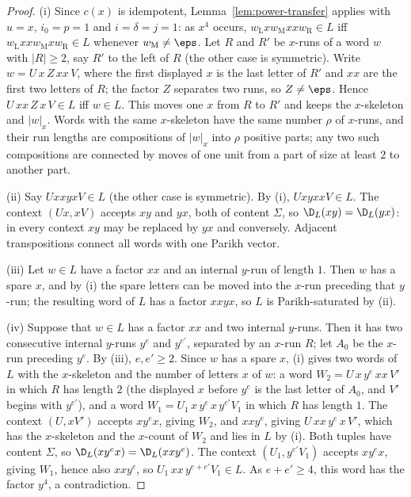 \begin{proof}
(i) Since $c(x)$ is idempotent, Lemma~\ref{lem:power-transfer} applies with
$u=x$, $i_0=p=1$ and $i=\delta=j=1$: as $x^4$ occurs, $w_{\mathrm L}xw_{\mathrm M}xxw_{\mathrm R}\in L$ iff
$w_{\mathrm L}xxw_{\mathrm M}xw_{\mathrm R}\in L$ whenever $w_{\mathrm M}\ne\eps$.  Let $R$ and $R'$ be $x$-runs of a word $w$ with
$|R|\ge2$, say $R'$ to the left of $R$ (the other case is symmetric).  Write
$w=U\,x\,Z\,xx\,V$, where the first displayed $x$ is the last letter of $R'$ and
$xx$ are the first two letters of $R$; the factor $Z$ separates two runs, so
$Z\ne\eps$.  Hence $U\,xx\,Z\,x\,V\in L$ iff $w\in L$.  This moves one $x$ from $R$
to $R'$ and keeps the $x$-skeleton and $|w|_x$.  Words with the same
$x$-skeleton have the same number $\rho$ of $x$-runs, and their run lengths are
compositions of $|w|_x$ into $\rho$ positive parts; any two such compositions
are connected by moves of one unit from a part of size at least $2$ to another
part.

(ii) Say $UxxyxV\in L$ (the other case is symmetric).  By (i),
$UxyxxV\in L$.  The context $(Ux,xV)$ accepts $xy$ and $yx$, both of content
$\Sigma$, so $\D_L(xy)=\D_L(yx)$: in every context $xy$ may be replaced by $yx$
and conversely.  Adjacent transpositions connect all words with one Parikh
vector.

(iii) Let $w\in L$ have a factor $xx$ and an internal $y$-run of length $1$.
Then $w$ has a spare $x$, and by (i) the spare letters can be moved into the
$x$-run preceding that $y$-run; the resulting word of $L$ has a factor $xxyx$,
so $L$ is Parikh-saturated by (ii).

(iv) Suppose that $w\in L$ has a factor $xx$ and two internal $y$-runs.  Then it
has two consecutive internal $y$-runs $y^e$ and $y^{e'}$, separated by an
$x$-run $R$; let $A_0$ be the $x$-run preceding $y^e$.  By (iii), $e,e'\ge2$.
Since $w$ has a spare $x$, (i) gives two words of $L$ with the $x$-skeleton and
the number of letters $x$ of $w$: a word $W_2=U\,x\,y^e\,xx\,V'$ in which $R$ has
length $2$ (the displayed $x$ before $y^e$ is the last letter of $A_0$, and $V'$
begins with $y^{e'}$), and a word $W_1=U_1\,x\,y^e\,x\,y^{e'}V_1$ in which $R$ has
length $1$.  The context $(U,xV')$ accepts $xy^ex$, giving $W_2$, and $xxy^e$,
giving $U\,xx\,y^e\,x\,V'$, which has the $x$-skeleton and the $x$-count of $W_2$
and lies in $L$ by (i).  Both tuples have content $\Sigma$, so
$\D_L(xy^ex)=\D_L(xxy^e)$.  The context $(U_1,y^{e'}V_1)$ accepts $xy^ex$, giving
$W_1$, hence also $xxy^e$, so $U_1\,xx\,y^{e+e'}V_1\in L$.  As $e+e'\ge4$, this
word has the factor $y^4$, a contradiction.
\end{proof}

